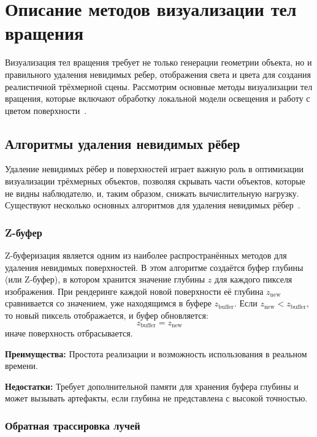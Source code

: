 \section{Описание методов визуализации тел вращения}

Визуализация тел вращения требует не только генерации геометрии объекта, но и правильного удаления невидимых ребер, отображения света и цвета для создания реалистичной трёхмерной сцены. Рассмотрим основные методы визуализации тел вращения, которые включают обработку локальной модели освещения и работу с цветом поверхности~\cite{all_cg}.

\subsection{Алгоритмы удаления невидимых рёбер}

Удаление невидимых рёбер и поверхностей играет важную роль в оптимизации визуализации трёхмерных объектов, позволяя скрывать части объектов, которые не видны наблюдателю, и, таким образом, снижать вычислительную нагрузку. Существуют несколько основных алгоритмов для удаления невидимых рёбер~\cite{invisible}.

\subsubsection{Z-буфер}

Z-буферизация является одним из наиболее распространённых методов для удаления невидимых поверхностей. В этом алгоритме создаётся буфер глубины (или Z-буфер), в котором хранится значение глубины $z$ для каждого пикселя изображения. При рендеринге каждой новой поверхности её глубина $z_{\text{new}}$ сравнивается со значением, уже находящимся в буфере $z_{\text{buffer}}$. Если $z_{\text{new}} < z_{\text{buffer}}$, то новый пиксель отображается, и буфер обновляется: 
$$
z_{\text{buffer}} = z_{\text{new}}
$$
иначе поверхность отбрасывается.

\textbf{Преимущества:} Простота реализации и возможность использования в реальном времени.

\textbf{Недостатки:} Требует дополнительной памяти для хранения буфера глубины и может вызывать артефакты, если глубина не представлена с высокой точностью.

\subsubsection{Обратная трассировка лучей}

